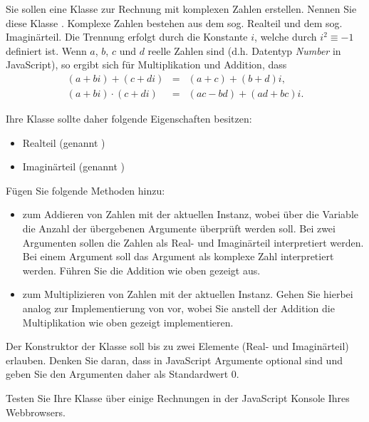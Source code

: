 %
\par Sie sollen eine Klasse zur Rechnung mit komplexen Zahlen erstellen. Nennen
Sie diese Klasse . Komplexe Zahlen bestehen aus dem sog. Realteil
und dem sog. Imaginärteil. Die Trennung erfolgt durch die Konstante $i$, welche
durch $i^2 \equiv -1$ definiert ist. Wenn $a$, $b$, $c$ und $d$ reelle Zahlen
sind (d.h. Datentyp \emph{Number} in JavaScript), so ergibt sich für
Multiplikation und Addition, dass
%
\begin{eqnarray}
(a + b i) + (c + d i)     & = & (a + c) + (b + d) i,\\
(a + b i) \cdot (c + d i) & = & (ac - bd) + (ad + bc) i.
\end{eqnarray}
%
\par Ihre Klasse sollte daher folgende Eigenschaften besitzen:
%
\begin{itemize}
\item
Realteil (genannt )
\item
Imaginärteil (genannt )
\end{itemize}
%
\par Fügen Sie folgende Methoden hinzu:
%
\begin{itemize}
\item
{} zum Addieren von Zahlen mit der aktuellen Instanz, wobei über die
Variable  die Anzahl der übergebenen Argumente überprüft
werden soll. Bei zwei Argumenten sollen die Zahlen als Real- und Imaginärteil
interpretiert werden. Bei einem Argument soll das Argument als komplexe Zahl
interpretiert werden. Führen Sie die Addition wie oben gezeigt aus.
%
\item
{} zum Multiplizieren von Zahlen mit der aktuellen Instanz. Gehen
Sie hierbei analog zur Implementierung von  vor, wobei Sie anstell
der Addition die Multiplikation wie oben gezeigt implementieren.
\end{itemize}
%
\par Der Konstruktor der Klasse soll bis zu zwei Elemente (Real- und
Imaginärteil) erlauben. Denken Sie daran, dass in JavaScript Argumente optional
sind und geben Sie den Argumenten daher als Standardwert $0$.
%
\par Testen Sie Ihre Klasse über einige Rechnungen in der JavaScript Konsole
Ihres Webbrowsers.